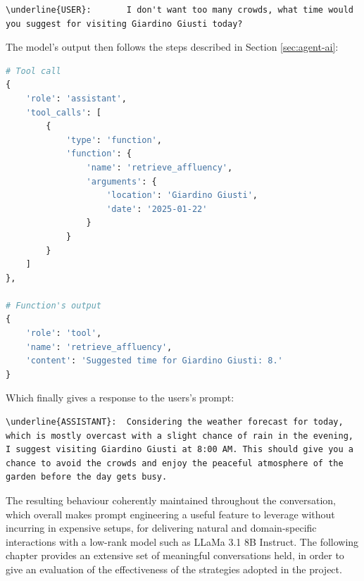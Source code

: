 \begin{Verbatim}[breaklines=true]
\underline{USER}:       I don't want too many crowds, what time would you suggest for visiting Giardino Giusti today?
\end{Verbatim}

The model's output then follows the steps described in Section \ref{sec:agent-ai}:

\begin{center}
\begin{minipage}{0.7\textwidth}
\begin{lstlisting}[language=Python, frame=single, caption=Tool call]
# Tool call
{
    'role': 'assistant',
    'tool_calls': [
        {
            'type': 'function',
            'function': {
                'name': 'retrieve_affluency',
                'arguments': {
                    'location': 'Giardino Giusti',
                    'date': '2025-01-22'
                }
            }
        }
    ]
},

# Function's output
{
    'role': 'tool',
    'name': 'retrieve_affluency',
    'content': 'Suggested time for Giardino Giusti: 8.'
}
\end{lstlisting}
\end{minipage}
\end{center}

Which finally gives a response to the users's prompt:

\begin{Verbatim}[breaklines=true]
\underline{ASSISTANT}:  Considering the weather forecast for today, which is mostly overcast with a slight chance of rain in the evening, I suggest visiting Giardino Giusti at 8:00 AM. This should give you a chance to avoid the crowds and enjoy the peaceful atmosphere of the garden before the day gets busy.
\end{Verbatim}

The resulting behaviour coherently maintained throughout the conversation, which overall makes prompt engineering a useful feature to leverage without incurring in expensive setups, for delivering natural and domain-specific interactions with a low-rank model such as LLaMa 3.1 8B Instruct. The following chapter provides an extensive set of meaningful conversations held, in order to give an evaluation of the effectiveness of the strategies adopted in the project.